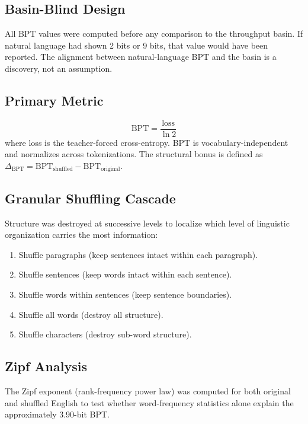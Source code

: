 \documentclass[11pt]{article}
\begin{document}
\subsection{Basin-Blind Design}

All BPT values were computed before any comparison to the throughput basin. If natural language had shown 2 bits or 9 bits, that value would have been reported. The alignment between natural-language BPT and the basin is a discovery, not an assumption.

\subsection{Primary Metric}

\begin{equation}
\mathrm{BPT} = \frac{\mathrm{loss}}{\ln 2}
\end{equation}
where loss is the teacher-forced cross-entropy. BPT is vocabulary-independent and normalizes across tokenizations. The structural bonus is defined as $\Delta_{\mathrm{BPT}} = \mathrm{BPT}_{\mathrm{shuffled}} - \mathrm{BPT}_{\mathrm{original}}$.

\subsection{Granular Shuffling Cascade}

Structure was destroyed at successive levels to localize which level of linguistic organization carries the most information:
\begin{enumerate}
\item Shuffle paragraphs (keep sentences intact within each paragraph).
\item Shuffle sentences (keep words intact within each sentence).
\item Shuffle words within sentences (keep sentence boundaries).
\item Shuffle all words (destroy all structure).
\item Shuffle characters (destroy sub-word structure).
\end{enumerate}

\subsection{Zipf Analysis}

The Zipf exponent (rank-frequency power law) was computed for both original and shuffled English to test whether word-frequency statistics alone explain the approximately 3.90-bit BPT.
\end{document}
